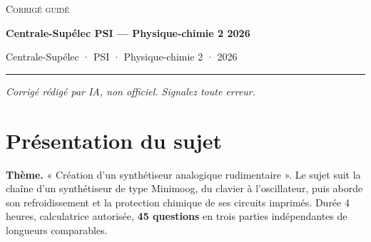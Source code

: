 \documentclass[11pt,a4paper]{article}
\begin{document}
\thispagestyle{plain}
\begin{center}
  {\small\scshape Corrigé guidé}\par\smallskip
  {\LARGE\bfseries Centrale-Supélec PSI — Physique-chimie 2 2026\par}\medskip
  {\large Centrale-Supélec · PSI · Physique-chimie 2 · 2026\par}
\end{center}
\vspace{2pt}\hrule\vspace{8pt}

\emph{Corrigé rédigé par IA, non officiel. Signalez toute erreur.}

\hypertarget{pruxe9sentation-du-sujet}{%
\section{Présentation du sujet}\label{pruxe9sentation-du-sujet}}

\textbf{Thème.} « Création d'un synthétiseur analogique rudimentaire ». Le sujet suit la chaîne d'un synthétiseur de type Minimoog, du clavier à l'oscillateur, puis aborde son refroidissement et la protection chimique de ses circuits imprimés. Durée 4 heures, calculatrice autorisée, \textbf{45 questions} en trois parties indépendantes de longueurs comparables.
\end{document}

